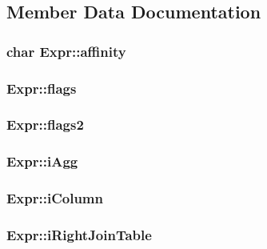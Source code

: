 \subsection{Member Data Documentation}
\hypertarget{struct_expr_aeb51b76e606d6fbae234e38473bf3dc9}{
\subsubsection[{affinity}]{\setlength{\rightskip}{0pt plus 5cm}char Expr\-::affinity}}\label{struct_expr_aeb51b76e606d6fbae234e38473bf3dc9}
\hypertarget{struct_expr_ad6013561807a4a5182ce928f263bc3bf}{
\subsubsection[{flags}]{ Expr\-::flags}}\label{struct_expr_ad6013561807a4a5182ce928f263bc3bf}
\hypertarget{struct_expr_af8d40f8e74d07557e89cfffeef3657e9}{
\subsubsection[{flags2}]{ Expr\-::flags2}}\label{struct_expr_af8d40f8e74d07557e89cfffeef3657e9}
\hypertarget{struct_expr_a9fe0ed6360b0a4cf5b67ab8def922033}{
\subsubsection[{i\-Agg}]{ Expr\-::i\-Agg}}\label{struct_expr_a9fe0ed6360b0a4cf5b67ab8def922033}
\hypertarget{struct_expr_ad19251a8eb6db3cf0bdffe0dcb07eeba}{
\subsubsection[{i\-Column}]{ Expr\-::i\-Column}}\label{struct_expr_ad19251a8eb6db3cf0bdffe0dcb07eeba}
\hypertarget{struct_expr_aa49b76f3628a7bf2b0997c33461cc651}{
\subsubsection[{i\-Right\-Join\-Table}]{ Expr\-::i\-Right\-Join\-Table}}\label{struct_expr_aa49b76f3628a7bf2b0997c33461cc651}
